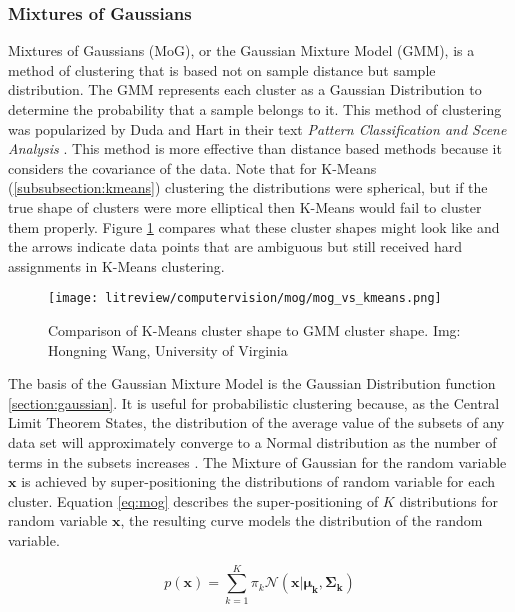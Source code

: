 \subsubsection{Mixtures of Gaussians}
 \label{subsection:mog}

Mixtures of Gaussians (MoG), or the Gaussian Mixture Model (GMM), is a method of clustering that is based not on sample distance but sample distribution. The GMM represents each cluster as a Gaussian Distribution to determine the probability that a sample belongs to it. This method of clustering was popularized by Duda and Hart in their text \emph{Pattern Classification and Scene Analysis} \cite{mog_seminal}. This method is more effective than distance based methods because it considers the covariance of the data. Note that for K-Means (\ref{subsubsection:kmeans}) clustering the distributions were spherical, but if the true shape of clusters were more elliptical then K-Means would fail to cluster them properly. Figure \ref{fig:cluster_shapes} compares what these cluster shapes might look like and the arrows indicate data points that are ambiguous but still received hard assignments in K-Means clustering.

\begin{figure}[ht]
	\centering
	\texttt{[image: litreview/computervision/mog/mog\_vs\_kmeans.png]}
	\captionsetup{format = hang}
	\caption{Comparison of K-Means cluster shape to GMM cluster shape. Img: Hongning Wang, University of Virginia }
	\label{fig:cluster_shapes}
\end{figure}
	
The basis of the Gaussian Mixture Model is the Gaussian Distribution function \ref{section:gaussian}. It is useful for probabilistic clustering because, as the Central Limit Theorem States, the distribution of the average value of the subsets of any data set will approximately converge to a Normal distribution as the number of terms in the subsets increases \cite{patterns_machine_learning}. The Mixture of Gaussian for the random variable $\boldsymbol{x}$ is achieved by super-positioning the distributions of random variable for each cluster. Equation \ref{eq:mog} describes the super-positioning of $K$ distributions for random variable $\boldsymbol{x}$, the resulting curve models the distribution of the random variable. 

\begin{equation}
p(\boldsymbol{x}) = \sum^{K}_{k = 1}\pi_k \mathcal{N}(\boldsymbol{x}|\boldsymbol{\mu_k}, \boldsymbol{\Sigma_k})
\label{eq:mog}
\end{equation}

